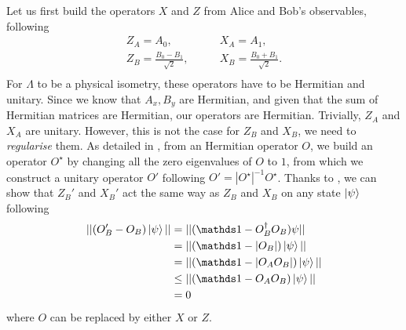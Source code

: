 Let us first build the operators $X$ and $Z$ from Alice and Bob's observables, following
\begin{equation}
	\begin{split}
		Z_A = A_0, \qquad &X_A = A_1, \\
		Z_B = \frac{B_0 - B_1}{\sqrt{2}}, \qquad &X_B = \frac{B_0 + B_1}{\sqrt{2}}. \\ 
	\end{split}
\end{equation}
For $\Lambda$ to be a physical isometry, these operators have to be Hermitian and unitary.
Since we know that $A_x,B_y$ are Hermitian, and given that the sum of Hermitian matrices are Hermitian, our operators are Hermitian.
Trivially, $Z_A$ and $X_A$ are unitary. 
However, this is not the case for $Z_B$ and $X_B$, we need to \textit{regularise} them.
As detailed in \cite{Supic2019}, from an Hermitian operator $O$, we build an operator $O^\star$ by changing all the zero eigenvalues of $O$ to $1$, from which we construct a unitary operator $O'$ following $O'=|O^\star|^{-1} O^\star$.
Thanks to , we can show that $Z_B'$ and $X_B'$ act the same way as $Z_B$ and $X_B$ on any state $\ket{\psi}$ following
\begin{equation}
	\begin{split}
		||(O_B' - O_B) \ket{\psi}|| &= ||(\id - O_B^\dag O_B)\psi|| \\
									&= ||(\id-|O_B|)\ket{\psi}|| \\
									&= ||(\id-|O_A O_B|)\ket{\psi}|| \\
									&\leq ||(\id-O_A O_B)\ket{\psi}|| \\
									&= 0
	\end{split}
\end{equation}
where $O$ can be replaced by either $X$ or $Z$.

